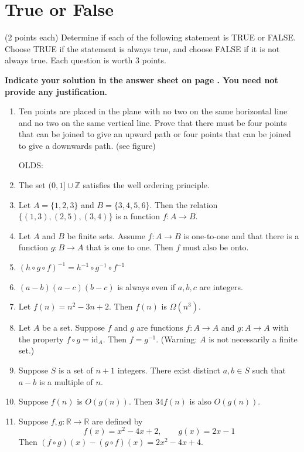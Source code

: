 \documentclass[12pt]{article}
\begin{document}
\newpage
\section*{True or False}

(2 points each) Determine if each of the following statement is TRUE or FALSE.\\Choose TRUE if the statement is always true, and choose FALSE if it is not always true. Each question is worth 3 points.

\vspace{0.2cm}

\noindent
\textbf{Indicate your solution in the answer sheet on page \pageref{answersheet}.  You need not provide any justification.}


\begin{enumerate}
\item Ten points are placed in the plane with no two on the same horizontal line and no two on the same vertical line. Prove that there must be four points that can be joined to give an upward path or four points that can be joined to give a downwards path. (see figure)

OLDS:
\item The set $(0,1]\cup\mathbb{Z}$ satisfies the well ordering principle.
\vspace{0.8cm}
\item Let $A=\{1,2,3\}$ and $B=\{3,4,5,6\}$. Then the relation $\{(1,3), (2,5), (3,4)\}$ is a function $f:A\to B$.
\vspace{0.8cm}
\item Let $A$ and $B$ be finite sets. Assume $f:A\to B$ is one-to-one and that there is a function $g:B\to A$ that is one to one. Then $f$ must also be onto.
\vspace{0.8cm}
\item $(h\circ g\circ f)^{-1}=h^{-1}\circ g^{-1}\circ f^{-1}$
\vspace{0.8cm}
\item $(a-b)(a-c)(b-c)$ is always even if $a,b,c$ are integers.
\vspace{0.8cm}
\item Let $f(n)=n^2-3n+2$. Then $f(n)$ is $\Omega(n^3)$.
\vspace{0.8cm}
\item Let $A$ be a set. Suppose $f$ and $g$ are functions $f:A\to A$ and $g:A\to A$ with the property $f\circ g=\textrm{id}_A$. Then $f=g^{-1}$. (Warning: $A$ is not necessarily a finite set.)
\vspace{0.8cm}
\item Suppose $S$ is a set of $n + 1$ integers. There exist distinct $a, b \in S$ such that $a - b$ is a multiple of $n$.
\vspace{0.8cm}
\item Suppose $f(n)$ is $O(g(n))$. Then $34 f(n)$ is also $O(g(n))$.
\vspace{0.8cm}
\item Suppose $f,g:\mathbb{R}\to\mathbb{R}$ are defined by
\[
f(x)=x^2-4x+2,\qquad g(x)=2x-1
\]
Then $(f\circ g)(x)-(g\circ f)(x)=2x^2-4x+4$.
\end{enumerate}
\end{document}
